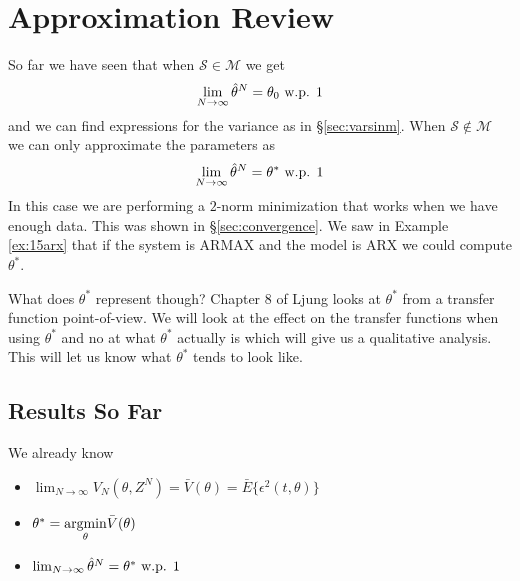 
\mainmatter
\setcounter{page}{1}

\lectureseries[\course]{\course}

\date{November 19, 2009}

\setaddress

\setcounter{lecture}{15}
\setcounter{chapter}{15}


\section{Approximation Review}
So far we have seen that when $\mathcal{S}\in\mathcal{M}$ we get
$$\lim_{N\to\infty}\hat{\theta}^N=\theta_0 \text{ w.p. } 1$$
and we can find expressions for the variance as in \S\ref{sec:varsinm}. When $\mathcal{S}\notin\mathcal{M}$ we can only approximate the parameters as
$$\lim_{N\to\infty}\hat{\theta}^N=\theta^\ast \text{ w.p. } 1$$
In this case we are performing a $2$-norm minimization that works when we have enough data. This was shown in \S\ref{sec:convergence}. We saw in Example \ref{ex:15arx} that if the system is ARMAX and the model is ARX we could compute $\theta^\ast$.

What does $\theta^\ast$ represent though? Chapter 8 of Ljung looks at $\theta^\ast$ from a transfer function point-of-view. We will look at the effect on the transfer functions when using $\theta^\ast$ and no at what $\theta^\ast$ actually is which will give us a qualitative analysis. This will let us know what $\theta^\ast$ tends to look like.

\subsection{Results So Far}
We already know
\begin{itemize}
\item $\lim_{N\to\infty}V_N(\theta,Z^N) = \bar{V}(\theta) = \bar{E}\{\epsilon^2(t,\theta)\}$
\item $\theta^\ast = \underset{\theta}{\operatorname{argmin}}\bar{V}(\theta)$
\item $\lim_{N\to\infty}\hat{\theta}^N = \theta^\ast \text{ w.p. } 1$
\end{itemize}

